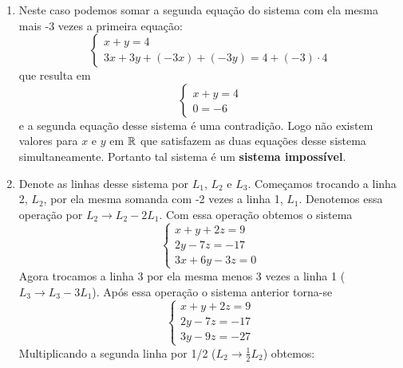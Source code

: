 \begin{exemplos}
    \begin{solucao}
        \begin{enumerate}[label={\arabic*})]
            \item Neste caso podemos somar a segunda equação do sistema com ela mesma mais -3 vezes a primeira equação:
                \[
                    \begin{cases}
                        x + y = 4\\
                        3x + 3y + (-3x) + (-3y) = 4 + (-3)\cdot 4
                    \end{cases}
                \]
            que resulta em
            \[
                \begin{cases}
                    x + y = 4\\
                    0 = -6
                \end{cases}
            \]
            e a segunda equação desse sistema é uma contradição. Logo não existem valores para $x$ e $y$ em $\mathbb{R}$ que satisfazem as duas equaç\~oes desse sistema simultaneamente. Portanto tal sistema é um \textbf{sistema impossível}.
                    \item Denote as linhas desse sistema por $L_1$, $L_2$ e $L_3$. Começamos trocando a linha 2, $L_2$, por ela mesma somanda com -2 vezes a linha 1, $L_1$. Denotemos essa operação por $L_2 \to L_2 - 2L_1$. Com essa operação obtemos o sistema
                        \[
                            \begin{cases}
                                x + y + 2z = 9\\
                                2y - 7z = -17\\
                                3x + 6y - 3z = 0
                            \end{cases}
                        \]
                        Agora trocamos a linha 3 por ela mesma menos 3 vezes a linha 1 ($L_3 \to L_3 - 3L_1$). Ap\'os essa operação o sistema anterior torna-se
                        \[
                            \begin{cases}
                                x + y + 2z = 9\\
                                2y - 7z = -17\\
                                3y - 9z = -27
                            \end{cases}
                        \]
                        Multiplicando a segunda linha por 1/2 ($L_2 \to \frac{1}{2}L_2$) obtemos:
                        \[
\]
\end{enumerate}
\end{solucao}
\end{exemplos}
